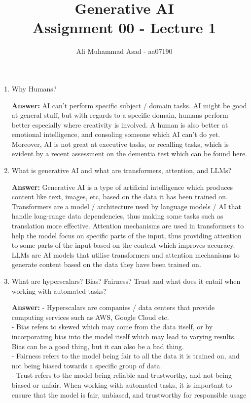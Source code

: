 \documentclass{article}
\title{Generative AI \\ Assignment 00 - Lecture 1}
\author{Ali Muhammad Asad - aa07190}
\date{}
\theoremstyle{mytheoremstyle}
\theoremstyle{mytheoremstyle}
\theoremstyle{myproblemstyle}
\begin{document}
\maketitle

\begin{enumerate}
    \item Why Humans? 
    
    \textbf{Answer:} AI can't perform specific subject / domain tasks. AI might be good at general stuff, but with regards to a specific domain, humans perform better especially where creativity is involved. A human is also better at emotional intelligence, and consoling someone which AI can't do yet. Moreover, AI is not great at executive tasks, or recalling tasks, which is evident by a recent assessment on the dementia test which can be found \href{https://futurism.com/the-byte/chatbots-cognitive-decline-dementia}{here}.

    \item What is generative AI and what are transformers, attention, and LLMs?
    
    \textbf{Answer:} Generative AI is a type of artificial intelligence which produces content like text, images, etc, based on the data it has been trained on. Transformers are a model / architecture used by language models / AI that handle long-range data dependencies, thus making some tasks such as translation more effective. Attention mechanisms are used in transformers to help the model focus on specific parts of the input, thus providing attention to some parts of the input based on the context which improves accuracy. LLMs are AI models that utilise transformers and attention mechanisms to generate content based on the data they have been trained on.

    \item What are hyperscalars? Bias? Fairness? Trust and what does it entail when working with automated tasks?
    
    \textbf{Answer:} - Hyperscalars are companies / data centers that provide computing services such as AWS, Google Cloud etc. \\
    - Bias refers to skewed which may come from the data itself, or by incorporating bias into the model itself which may lead to varying results. Bias can be a good thing, but it can also be a bad thing. \\ 
    - Fairness refers to the model being fair to all the data it is trained on, and not being biased towards a specific group of data. \\
    - Trust refers to the model being reliable and trustworthy, and not being biased or unfair. When working with automated tasks, it is important to ensure that the model is fair, unbiased, and trustworthy for responsible usage


\end{enumerate}
\end{document}
